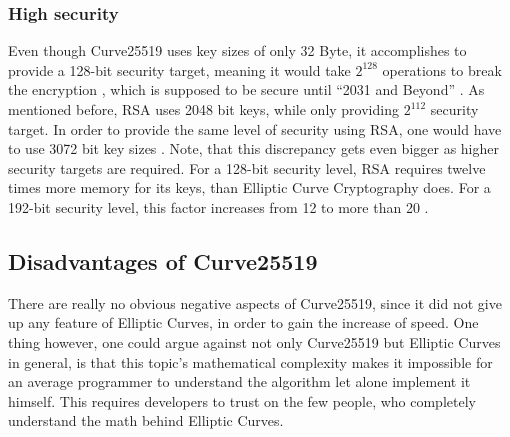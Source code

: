 \subsubsection{High security}
Even though Curve25519 uses key sizes of only 32 Byte, it accomplishes to provide a 128-bit security target, meaning it would take $ 2^{128} $ operations to break the encryption \cite{SecLevel}, which is supposed to be secure until “2031 and Beyond” \cite{KeySize}. As mentioned before, RSA uses 2048 bit keys, while only providing $ 2^{112} $ security target. In order to provide the same level of security using RSA, one would have to use 3072 bit key sizes \cite{KeySize}. Note, that this discrepancy gets even bigger as higher security targets are required. For a 128-bit security level, RSA requires twelve times more memory for its keys, than Elliptic Curve Cryptography does. For a 192-bit security level, this factor increases from 12 to more than 20 \cite{SecLevelInc}.

\subsection{Disadvantages of Curve25519}
There are really no obvious negative aspects of Curve25519, since it did not give up any feature of Elliptic Curves, in order to gain the increase of speed. One thing however, one could argue against not only Curve25519 but Elliptic Curves in general, is that this topic's mathematical complexity makes it impossible for an average programmer to understand the algorithm let alone implement it himself. This requires developers to trust on the few people, who completely understand the math behind Elliptic Curves.
